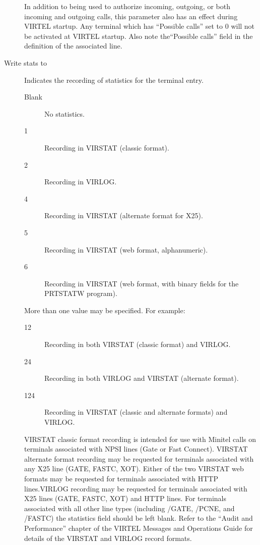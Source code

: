 \documentclass[letterpaper,10pt,english]{sphinxmanual}
\begin{document}
\begin{description}
In addition to being used to authorize incoming, outgoing, or both incoming and outgoing calls, this parameter also has an effect during VIRTEL startup. Any terminal which has “Possible calls” set to 0 will not be activated at VIRTEL startup. Also note the“Possible calls” field in the definition of the associated line.

\item[{Write stats to}] \leavevmode
Indicates the recording of statistics for the terminal entry.
\begin{description}
\item[{Blank}] \leavevmode
No statistics.

\item[{1}] \leavevmode
Recording in VIRSTAT (classic format).

\item[{2}] \leavevmode
Recording in VIRLOG.

\item[{4}] \leavevmode
Recording in VIRSTAT (alternate format for X25).

\item[{5}] \leavevmode
Recording in VIRSTAT (web format, alphanumeric).

\item[{6}] \leavevmode
Recording in VIRSTAT (web format, with binary fields for the PRTSTATW program).

\end{description}

More than one value may be specified. For example:
\begin{description}
\item[{12}] \leavevmode
Recording in both VIRSTAT (classic format) and VIRLOG.

\item[{24}] \leavevmode
Recording in both VIRLOG and VIRSTAT (alternate format).

\item[{124}] \leavevmode
Recording in VIRSTAT (classic and alternate formats) and VIRLOG.

\end{description}

VIRSTAT classic format recording is intended for use with Minitel calls on terminals associated with NPSI lines (Gate or Fast Connect). VIRSTAT alternate format recording may be requested for terminals associated with any X25 line (GATE, FASTC, XOT). Either of the two VIRSTAT web formats may be requested for terminals associated with HTTP lines.VIRLOG recording may be requested for terminals associated with X25 lines (GATE, FASTC, XOT) and HTTP lines. For terminals associated with all other line types (including /GATE, /PCNE, and /FASTC) the statistics field should be left blank. Refer to the “Audit and Performance” chapter of the VIRTEL Messages and Operations Guide for details of the VIRSTAT and VIRLOG record formats.


\end{description}
\end{document}
